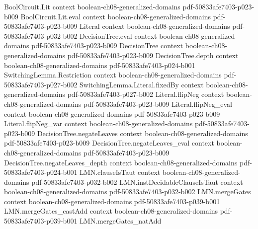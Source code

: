 \begin{lemma}
\label{BoolFourier.parseval_identity}
\leanok
{}
\proofstep
  {BoolCircuit.Lit}
  {context}
  {boolean-ch08-generalized-domains}
  {pdf-50833afe7403-p023-b009}
\proofstep
  {BoolCircuit.Lit.eval}
  {context}
  {boolean-ch08-generalized-domains}
  {pdf-50833afe7403-p023-b009}
\proofstep
  {Literal}
  {context}
  {boolean-ch08-generalized-domains}
  {pdf-50833afe7403-p032-b002}
\proofstep
  {DecisionTree.eval}
  {context}
  {boolean-ch08-generalized-domains}
  {pdf-50833afe7403-p023-b009}
\proofstep
  {DecisionTree}
  {context}
  {boolean-ch08-generalized-domains}
  {pdf-50833afe7403-p023-b009}
\proofstep
  {DecisionTree.depth}
  {context}
  {boolean-ch08-generalized-domains}
  {pdf-50833afe7403-p024-b001}
\proofstep
  {SwitchingLemma.Restriction}
  {context}
  {boolean-ch08-generalized-domains}
  {pdf-50833afe7403-p027-b002}
\proofstep
  {SwitchingLemma.Literal.fixedBy}
  {context}
  {boolean-ch08-generalized-domains}
  {pdf-50833afe7403-p027-b002}
\proofstep
  {Literal.flipNeg}
  {context}
  {boolean-ch08-generalized-domains}
  {pdf-50833afe7403-p023-b009}
\proofstep
  {Literal.flipNeg_eval}
  {context}
  {boolean-ch08-generalized-domains}
  {pdf-50833afe7403-p023-b009}
\proofstep
  {Literal.flipNeg_var}
  {context}
  {boolean-ch08-generalized-domains}
  {pdf-50833afe7403-p023-b009}
\proofstep
  {DecisionTree.negateLeaves}
  {context}
  {boolean-ch08-generalized-domains}
  {pdf-50833afe7403-p023-b009}
\proofstep
  {DecisionTree.negateLeaves_eval}
  {context}
  {boolean-ch08-generalized-domains}
  {pdf-50833afe7403-p023-b009}
\proofstep
  {DecisionTree.negateLeaves_depth}
  {context}
  {boolean-ch08-generalized-domains}
  {pdf-50833afe7403-p024-b001}
\proofstep
  {LMN.clauseIsTaut}
  {context}
  {boolean-ch08-generalized-domains}
  {pdf-50833afe7403-p032-b002}
\proofstep
  {LMN.instDecidableClauseIsTaut}
  {context}
  {boolean-ch08-generalized-domains}
  {pdf-50833afe7403-p032-b002}
\proofstep
  {LMN.mergeGates}
  {context}
  {boolean-ch08-generalized-domains}
  {pdf-50833afe7403-p039-b001}
\proofstep
  {LMN.mergeGates_castAdd}
  {context}
  {boolean-ch08-generalized-domains}
  {pdf-50833afe7403-p039-b001}
\proofstep
  {LMN.mergeGates_natAdd}

\end{lemma}
